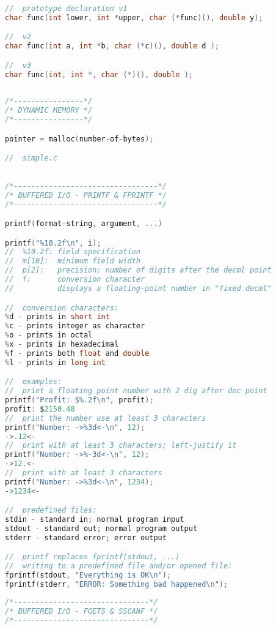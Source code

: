 \documentclass[8pt]{extarticle}
\begin{document}
\begin{small}
\begin{multicols}{2}
\begin{lstlisting}[language=C]
//  prototype declaration v1
char func(int lower, int *upper, char (*func)(), double y);

//  v2
char func(int a, int *b, char (*c)(), double d );

//  v3
char func(int, int *, char (*)(), double );
	
\end{lstlisting}

\begin{lstlisting}[language=C]
/*----------------*/
/* DYNAMIC MEMORY */
/*----------------*/

pointer = malloc(number-of-bytes);

//  simple.c



\end{lstlisting}

\begin{lstlisting}[language=C]
/*---------------------------------*/
/* BUFFERED I/O - PRINTF & FPRINTF */
/*---------------------------------*/

printf(format-string, argument, ...)

printf("%10.2f\n", i);
//  %10.2f: field specification
//  m[10]: 	minimum field width
//  p[2]: 	precision; number of digits after the decml point
//  f: 		conversion character
//	   		displays a floating-point number in "fixed decml"

//  conversion characters:
%d - prints in short int
%c - prints integer as character
%o - prints in octal
%x - prints in hexadecimal
%f - prints both float and double
%l - prints in long int

//  examples:
//  print a floating point number with 2 dig after dec point
printf("Profit: $%.2f\n", profit);
profit: $2150.48
//  print the number use at least 3 characters
printf("Number: ->%3d<-\n", 12);
->.12<-
//  print with at least 3 characters; left-justify it
printf("Number: ->%-3d<-\n", 12);
->12.<-
//  print with at least 3 characters
printf("Number: ->%3d<-\n", 1234);
->1234<-

//  predefined files:
stdin - standard in; normal program input
stdout - standard out; normal program output
stderr - standard error; error output

//  printf replaces fprintf(stdout, ...)
//  writing to a predefined file and/or opened file:
fprintf(stdout, "Everything is OK\n");
fprintf(stderr, "ERROR: Something bad happened\n");
\end{lstlisting}

\begin{lstlisting}[language=C]
/*-------------------------------*/
/* BUFFERED I/O - FGETS & SSCANF */
/*-------------------------------*/


\end{lstlisting}
\end{multicols}
\end{small}
\end{document}

